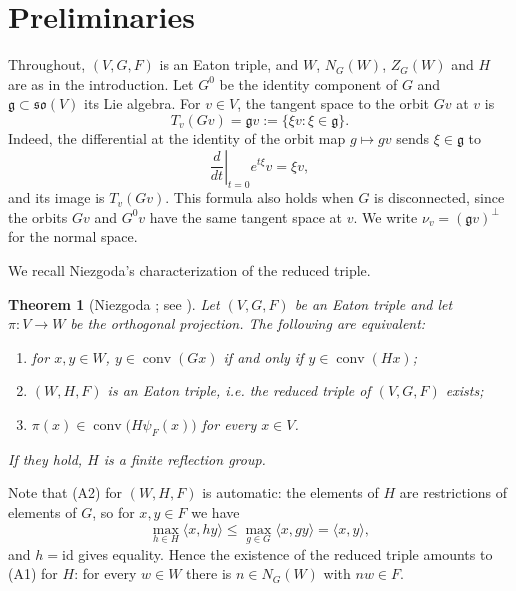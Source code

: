 \documentclass[11pt]{amsart}
\theoremstyle{plain}
\newtheorem{theorem}{Theorem}[section]
\theoremstyle{definition}
\theoremstyle{remark}
\newcommand{\fg}{\mathfrak g}
\newcommand{\ip}[2]{\langle #1,#2\rangle}
\newcommand{\conv}{\operatorname{conv}}
\begin{document}
\section{Preliminaries}\label{sec:prelim}

Throughout, $(V,G,F)$ is an Eaton triple, and $W$, $N_G(W)$, $Z_G(W)$ and $H$ are as in the introduction. Let $G^0$ be the identity component of $G$ and $\fg\subset\mathfrak{so}(V)$ its Lie algebra. For $v\in V$, the tangent space to the orbit $Gv$ at $v$ is
\[
T_v(Gv)=\fg v:=\{\xi v:\xi\in\fg\}.
\]
Indeed, the differential at the identity of the orbit map $g\mapsto gv$ sends $\xi\in\fg$ to
\[
\left.\frac{d}{dt}\right|_{t=0}e^{t\xi}v=\xi v,
\]
and its image is $T_v(Gv)$. This formula also holds when $G$ is disconnected, since the orbits $Gv$ and $G^0v$ have the same tangent space at $v$. We write $\nu_v=(\fg v)^\perp$ for the normal space.

We recall Niezgoda's characterization of the reduced triple.

\begin{theorem}[Niezgoda {\cite[Theorem 3.2]{Niezgoda}}; see {\cite[Theorem 1.1]{DolberryTam}}]\label{thm:niezgoda}
Let $(V,G,F)$ be an Eaton triple and let $\pi:V\to W$ be the orthogonal projection. The following are equivalent:
\begin{enumerate}
\item for $x,y\in W$, $y\in\conv(Gx)$ if and only if $y\in\conv(Hx)$;
\item $(W,H,F)$ is an Eaton triple, i.e. the reduced triple of $(V,G,F)$ exists;
\item $\pi(x)\in\conv\big(H\psi_F(x)\big)$ for every $x\in V$.
\end{enumerate}
If they hold, $H$ is a finite reflection group.
\end{theorem}

Note that (A2) for $(W,H,F)$ is automatic: the elements of $H$ are restrictions of elements of $G$, so for $x,y\in F$ we have
\[
\max_{h\in H}\ip{x}{hy}\le\max_{g\in G}\ip{x}{gy}=\ip{x}{y},
\]
and $h=\mathrm{id}$ gives equality. Hence the existence of the reduced triple amounts to (A1) for $H$: for every $w\in W$ there is $n\in N_G(W)$ with $nw\in F$.
\end{document}
